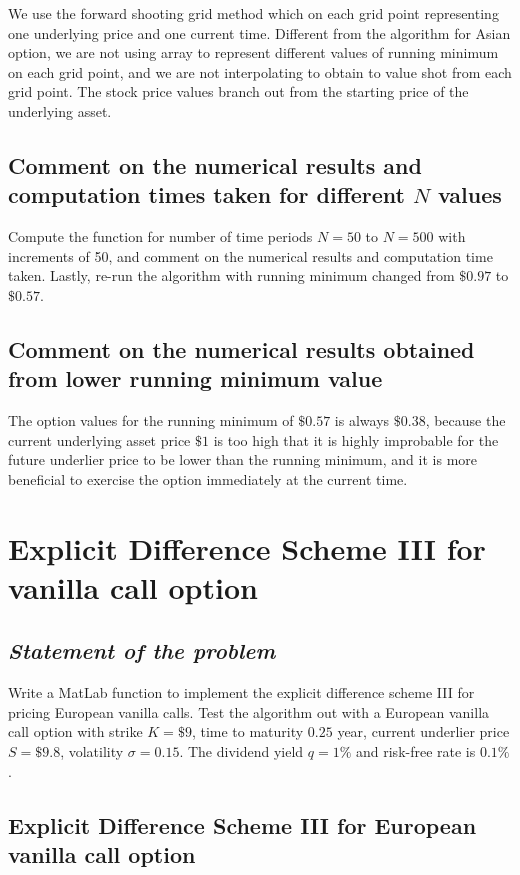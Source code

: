 We use the forward shooting grid method which on each grid point representing one underlying price and one current time. Different from the algorithm for Asian option, we are not using array to represent different values of running minimum on each grid point, and we are not interpolating to obtain to value shot from each grid point. The stock price values branch out from the starting price of the underlying asset.

\subsection{Comment on the numerical results and computation times taken for different $N$ values}
Compute the function for number of time periods $N = 50$ to $N = 500$ with increments of 50, and comment on the numerical results and computation time taken. Lastly, re-run the algorithm with running minimum changed from $\$0.97$ to $\$0.57$.

\subsection{Comment on the numerical results obtained from lower running minimum value}
The option values for the running minimum of $\$0.57$ is always $\$0.38$, because the current underlying asset price $\$1$ is too high that it is highly improbable for the future underlier price to be lower than the running minimum, and it is more beneficial to exercise the option immediately at the current time.

\section{Explicit Difference Scheme III for vanilla call option}
\subsection*{\emph{Statement of the problem}}
Write a MatLab function to implement the explicit difference scheme III for pricing European vanilla calls. Test the algorithm out with a European vanilla call option with strike $K = \$9$, time to maturity $0.25$ year, current underlier price $S = \$9.8$, volatility $\sigma=0.15$. The dividend yield $q = 1\%$ and risk-free rate is $0.1\%$.

\subsection{Explicit Difference Scheme III for European vanilla call option}


